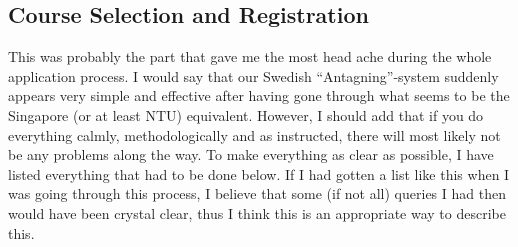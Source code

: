 \subsection*{Course Selection and Registration}\label{courses}
This was probably the part that gave me the most head ache during the whole application process. I would say that our Swedish ``Antagning''-system suddenly appears very simple and effective after having gone through what seems to be the Singapore (or at least NTU) equivalent. However, I should add that if you do everything calmly, methodologically and as instructed, there will most likely not be any problems along the way. To make everything as clear as possible, I have listed everything that had to be done below. If I had gotten a list like this when I was going through this process, I believe that some (if not all) queries I had then would have been crystal clear, thus I think this is an appropriate way to describe this. 
